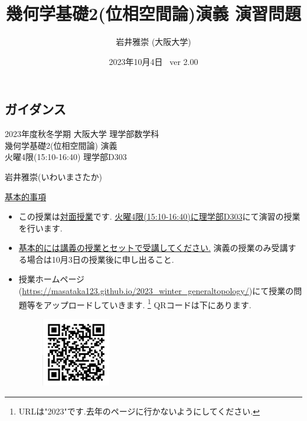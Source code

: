 \documentclass[dvipdfmx,a4paper,11pt]{article}
\title{幾何学基礎2(位相空間論)演義 演習問題}
\author{岩井雅崇 (大阪大学)}
\date{2023年10月4日 \, ver 2.00}
\theoremstyle{definition}
\begin{document}
\maketitle
\tableofcontents
\newpage

\begin{center}
\setcounter{section}{-1}
\section{ガイダンス}
\label{sec-guide}
\end{center}

\begin{center}
{\Large 2023年度秋冬学期 大阪大学 理学部数学科 \\ 幾何学基礎2(位相空間論) 演義} \\
 火曜4限(15:10-16:40) 理学部D303
\end{center}
\begin{flushright}
 岩井雅崇(いわいまさたか) \\
\end{flushright}
{\Large \underline{基本的事項}}
\begin{itemize}
  \setlength{\parskip}{0cm} %
  \setlength{\itemsep}{0cm} %
\item この授業は\underline{対面授業}です. \underline{火曜4限(15:10-16:40)に理学部D303}にて演習の授業を行います.
\item \underline{基本的には講義の授業とセットで受講してください.} 演義の授業のみ受講する場合は10月3日の授業後に申し出ること. 
\item 授業ホームページ(\url{https://masataka123.github.io/2023_winter_generaltopology/})にて授業の問題等をアップロードしていきます. \footnote{URLは"2023"です.去年のページに行かないようにしてください. }
QRコードは下にあります.
\begin{figure}[htbp]
\begin{center}
 \includegraphics[height=30mm, width=30mm]{genetopo.png}
\end{center}
\end{figure}
\end{itemize}

\end{document}

